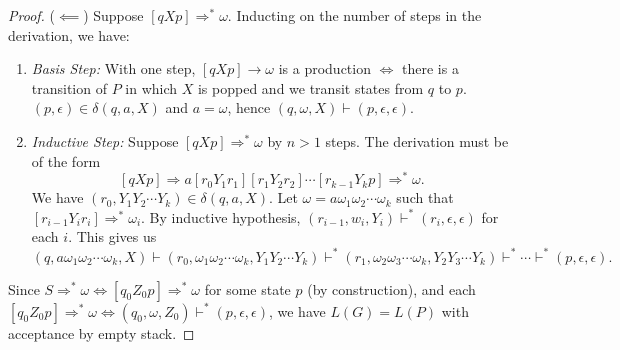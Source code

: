 \begin{proof}
  ($\impliedby$) Suppose $\left[ qXp \right] \Rightarrow ^{*}\omega$. Inducting
  on the number of steps in the derivation, we have:
  \begin{enumerate}
    \item \textit{Basis Step:} With one step, $\left[ qXp \right] \to \omega$
      is a production $\iff$ there is a transition of $P$ in which $X$ is
      popped and we transit states from $q$ to $p$. $\left( p,\epsilon \right)
      \in \delta\left( q,a,X \right) $ and $a=\omega$, hence $\left( q,\omega,X
      \right) \vdash \left( p,\epsilon,\epsilon \right) $.
    \item \textit{Inductive Step:} Suppose $\left[ qXp \right] \Rightarrow
      ^{*}\omega$ by $n>1$ steps. The derivation must be of the form
      \[\left[ qXp \right] \Rightarrow a\left[ r_0Y_1r_1 \right] \left[
      r_1Y_2r_2 \right] \cdots\left[ r_{k-1}Y_kp \right]\Rightarrow
    ^{*}\omega.\]
    We have $\left( r_0,Y_1Y_2\cdots Y_k \right) \in \delta\left( q,a,X \right) $.
    Let $\omega=a\omega_1\omega_2\cdots\omega_k$ such that $\left[
    r_{i-1}Y_ir_i \right] \Rightarrow ^{*}\omega_i$. By inductive hypothesis,
    $\left( r_{i-1},w_i,Y_i \right) \vdash^{*}\left( r_i,\epsilon,\epsilon
    \right) $ for each $i$. This gives us
    \[\left( q,a\omega_1\omega_2\cdots\omega_k,X \right) \vdash\left(
    r_0,\omega_1\omega_2\cdots\omega_k,Y_1Y_2\cdots Y_k \right)\vdash
  ^{*}\left( r_1,\omega_2\omega_3\cdots\omega_k,Y_2Y_3\cdots Y_k \right)\vdash
^{*}\cdots\vdash ^{*}\left( p,\epsilon,\epsilon \right).\] 
  \end{enumerate}
  Since $S\Rightarrow ^{*}\omega\iff\left[ q_0Z_0p \right]
  \Rightarrow ^{*}\omega$ for some state $p$ (by construction), and each
  $\left[ q_0Z_0p \right]\Rightarrow ^{*}\omega\iff\left( q_0,\omega,Z_0
  \right) \vdash^{*}\left( p,\epsilon,\epsilon \right) $, we have $L(G)=L(P)$
  with acceptance by empty stack.
\end{proof}

